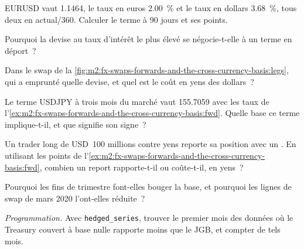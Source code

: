 \begin{exercise}[$\star$]\label{exo:m2:fx-swaps-forwards-and-the-cross-currency-basis:1}
EURUSD vaut 1.1464, le taux en euros 2.00~\% et le taux en dollars 3.68~\%, tous deux
en actual/360. Calculer le terme à 90 jours et ses points.
\end{exercise}

\begin{exercise}[$\star$]\label{exo:m2:fx-swaps-forwards-and-the-cross-currency-basis:2}
Pourquoi la devise au taux d'intérêt le plus élevé se négocie-t-elle à un terme en déport~?
\end{exercise}

\begin{exercise}[$\star$]\label{exo:m2:fx-swaps-forwards-and-the-cross-currency-basis:3}
Dans le swap de la \cref{fig:m2:fx-swaps-forwards-and-the-cross-currency-basis:legs}, qui a emprunté
quelle devise, et quel est le coût en yens des dollars~?
\end{exercise}

\begin{exercise}[$\star\star$]\label{exo:m2:fx-swaps-forwards-and-the-cross-currency-basis:4}
Le terme USDJPY à trois mois du marché vaut 155.7059 avec les taux de
l'\cref{ex:m2:fx-swaps-forwards-and-the-cross-currency-basis:fwd}. Quelle base
ce terme implique-t-il, et que signifie son signe~?
\end{exercise}

\begin{exercise}[$\star\star$]\label{exo:m2:fx-swaps-forwards-and-the-cross-currency-basis:5}
Un trader long de USD~100 millions contre yens reporte sa position avec un .
En utilisant les points  de l'\cref{ex:m2:fx-swaps-forwards-and-the-cross-currency-basis:fwd},
combien un report rapporte-t-il ou coûte-t-il, en yens~?
\end{exercise}

\begin{exercise}[$\star\star$]\label{exo:m2:fx-swaps-forwards-and-the-cross-currency-basis:6}
Pourquoi les fins de trimestre font-elles bouger la base, et pourquoi les lignes de swap de mars 2020
l'ont-elles réduite~?
\end{exercise}

\begin{exercise}[$\star\star\star$]\label{exo:m2:fx-swaps-forwards-and-the-cross-currency-basis:7}
\emph{Programmation.} Avec \texttt{hedged\_series}, trouver le premier mois des données
où le Treasury couvert à base nulle rapporte moins que le JGB, et compter de tels
mois.
\end{exercise}


